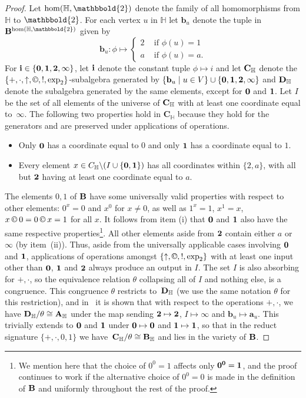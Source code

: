 \documentclass[eqnor,reqno]{amsart}
\theoremstyle{plain}
\theoremstyle{definition}
\newcommand{\cc}{\mathbin{\textup{\copyright}}}
\begin{document}
\begin{proof}
Let $\hom(\mathbb{H},\mathbbold{2})$ denote the family of all homomorphisms from $\mathbb{H}$ to $\mathbbold{2}$. 
For each vertex $u$ in $\mathbb{H}$ let $\mathbf{b}_u$ denote the tuple in  ${\bf B}^{\hom(\mathbb{H},\mathbbold{2})}$ given by 
\[
\mathbf{b}_u:\phi\mapsto\begin{cases}
2&\text{ if $\phi(u)=1$}\\
a&\text{ if $\phi(u)=a$}.
\end{cases}
\]
For ${\bf i}\in\{{\bf 0},{\bf 1},{\bf 2},{\bf \infty}\}$, let  ${\bf i}$ denote the constant tuple $\phi\mapsto i$ and let ${\bf C}_\mathbb{H}$ denote the $\{+,\cdot,\uparrow,\cc,!,\exp_2\}$-subalgebra generated by $\{\mathbf{b}_u\mid u\in V\}\cup \{{\bf 0},{\bf 1},{\bf 2},\infty\}$ and ${\bf D}_\mathbb{H}$ denote the subalgebra generated by the same elements, except for ${\bf 0}$ and ${\bf 1}$.  
Let $I$ be the set of all elements of the universe of ${\bf C}_\mathbb{H}$ with at least one coordinate equal to~$\infty$.  
The following two properties hold in $\mathbf{C}_\mathbb{H}$ because they hold for the generators and are preserved under applications of operations.
\begin{itemize}
\item[(i)] Only ${\bf 0}$ has a coordinate equal to $0$ and only ${\bf 1}$ has a coordinate equal to $1$.
\item[(ii)] Every element $x\in C_\mathbb{H}\backslash(I\cup\{{\bf 0},{\bf 1}\})$ has all coordinates within $\{2,a\}$, with all but ${\bf 2}$ having at least one coordinate equal to $a$.
\end{itemize}
The elements $0,1$ of ${\bf B}$ have some universally valid properties with respect to other elements: $0^x=0$ and $x^0$ for $x\neq 0$, as well as $1^x=1$, $x^1=x$, $x\cc 0=0\cc x=1$ for all $x$.  
It follows from  item (i) that ${\bf 0}$ and ${\bf 1}$ also have the same respective properties\footnote{We mention here that the choice of $0^0=1$ affects only ${\bf 0}^{\bf 0}={\bf 1}$, and the proof continues to work if the alternative choice of $0^0=0$ is made in the definition of ${\bf B}$ and uniformly throughout the rest of the proof.}.  
All other elements aside from ${\bf 2}$ contain either $a$ or $\infty$ (by item~(ii)).  
Thus, aside from the universally applicable cases involving ${\bf 0}$ and ${\bf 1}$, applications of operations amongst $\{\uparrow,\cc,!,\exp_2\}$ with at least one input other than ${\bf 0}$, ${\bf 1}$ and ${\bf 2}$ always produce an output in $I$.  
The set $I$ is also absorbing for $+,\cdot$, so the equivalence relation $\theta$ collapsing all of $I$ and nothing else, is a congruence.  
This congruence $\theta$ restricts to~${\bf D}_\mathbb{H}$ (we use the same notation $\theta$ for this restriction), and in~\cite{JRZ} it is shown that with respect to the operations $+,\cdot$, we have ${\bf D}_\mathbb{H}/\theta\cong {\bf A}_\mathbb{H}$ under the map sending ${\bf 2}\mapsto {\bf 2}$,  $I\mapsto \infty$ and  $\mathbf{b}_u\mapsto \mathbf{a}_u$.  
This trivially extends to ${\bf 0}$ and ${\bf 1}$ under ${\bf 0}\mapsto {\bf 0}$ and ${\bf 1}\mapsto {\bf 1}$, so that in the reduct signature $\{+,\cdot,0,1\}$ we have~${\bf C}_\mathbb{H}/\theta\cong{\bf B}_\mathbb{H}$ and lies in the variety of ${\bf B}$. 


\end{proof}
\end{document}
